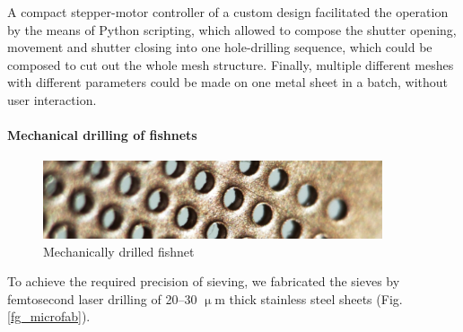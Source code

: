 A compact stepper-motor controller of a custom design \cite{dominec2015_triostepper} facilitated the operation by the means of Python scripting, which allowed to compose the shutter opening, movement and shutter closing into one hole-drilling sequence, which could be composed to cut out the whole mesh structure. Finally, multiple different meshes with different parameters could be made on one metal sheet in a batch, without user interaction.

\paragraph{Mechanical drilling of fishnets}%
\begin{figure}[ht] \caption{Mechanically drilled fishnet}  \centering \includegraphics[width=10cm]{img/fishnet.pdf} \end{figure}

To achieve the required precision of sieving, we fabricated the sieves by femtosecond laser drilling of 20--30 $\upmu$m thick stainless steel sheets (Fig. \ref{fg_microfab}). 


\todo{}
\todo{}

